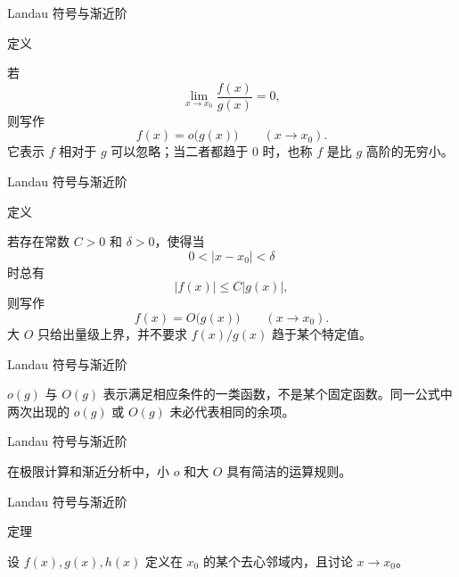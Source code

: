 \documentclass[aspectratio=169,10pt,fontset=fandol]{ctexbeamer}
\begin{document}
\begin{frame}[t,fragile]{Landau 符号与渐近阶}
\footnotesize
\begin{block}{定义}
{\footnotesize

若
\[
\lim_{x\to x_0}\frac{f(x)}{g(x)}=0,
\]
则写作
\[
f(x)=o\bigl(g(x)\bigr)\qquad(x\to x_0).
\]
它表示 \(f\) 相对于 \(g\) 可以忽略；当二者都趋于 \(0\) 时，也称 \(f\) 是比 \(g\) 高阶的无穷小。

}
\end{block}
\end{frame}
\begin{frame}[t,fragile]{Landau 符号与渐近阶}
\footnotesize
\begin{block}{定义}
{\footnotesize

若存在常数 \(C>0\) 和 \(\delta>0\)，使得当
\[
0<|x-x_0|<\delta
\]
时总有
\[
|f(x)|\le C|g(x)|,
\]
则写作
\[
f(x)=O\bigl(g(x)\bigr)\qquad(x\to x_0).
\]
大 \(O\) 只给出量级上界，并不要求 \(f(x)/g(x)\) 趋于某个特定值。

}
\end{block}
\end{frame}
\begin{frame}[t,fragile]{Landau 符号与渐近阶}
\footnotesize
{\footnotesize
\(o(g)\) 与 \(O(g)\) 表示满足相应条件的一类函数，不是某个固定函数。同一公式中两次出现的 \(o(g)\) 或 \(O(g)\) 未必代表相同的余项。

}
\end{frame}
\begin{frame}[t,fragile]{Landau 符号与渐近阶}
\footnotesize
{\footnotesize


在极限计算和渐近分析中，小 \(o\) 和大 \(O\) 具有简洁的运算规则。


}
\end{frame}
\begin{frame}[t,fragile]{Landau 符号与渐近阶}
\footnotesize
\begin{block}{定理}
{\footnotesize

设 \(f(x),g(x),h(x)\) 定义在 \(x_0\) 的某个去心邻域内，且讨论 \(x\to x_0\)。
}
\end{block}
\end{frame}
\end{document}
